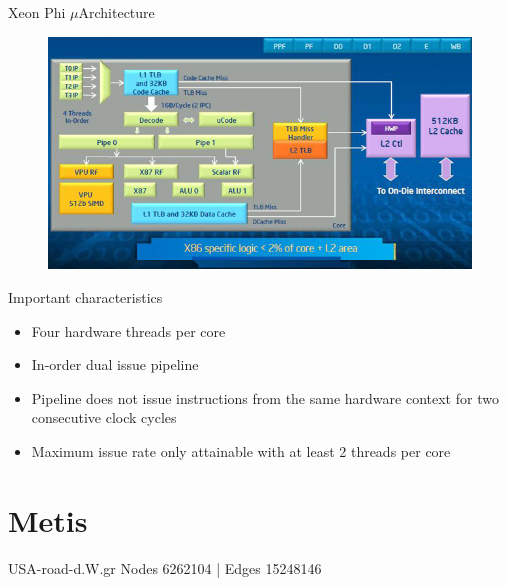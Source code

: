 \documentclass{beamer}
\begin{document}
\begin{frame}{Xeon Phi $\mu$Architecture}
  \begin{center}
  \begin{figure}[htbp]
      \includegraphics[scale=.45]{img/phi_arch.jpg}
  \end{figure}
  \end{center}
\end{frame}

\begin{frame}{Important characteristics}
  \begin{itemize}
    \item Four hardware threads per core
    \item In-order dual issue pipeline
    \item Pipeline does not issue instructions from the same hardware
      context for two consecutive clock cycles
    \item Maximum issue rate only attainable with at least 2 threads per
      core
  \end{itemize}
\end{frame}




\section{Metis}

\begin{frame}
USA-road-d.W.gr
Nodes 6262104 | Edges 15248146
\end{frame}
\end{document}
